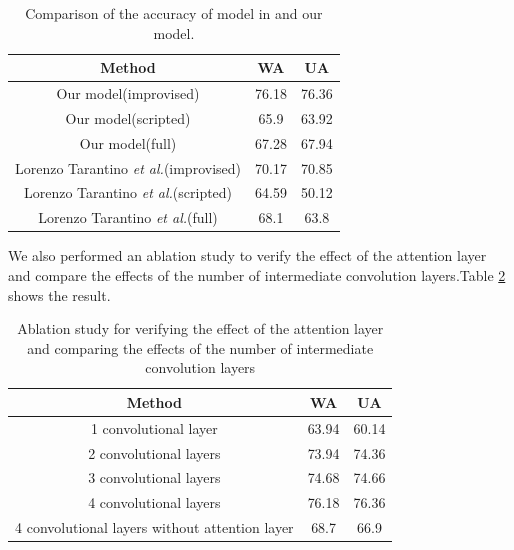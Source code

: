 \documentclass[10pt, conference, compsocconf]{IEEEtran}
\begin{document}
\begin{table}[h]
	\renewcommand\arraystretch{1.5}
	\setlength{\abovecaptionskip}{-0.2cm}
	\caption{Comparison of the accuracy of model in \cite{tarantino2019self} and our model.}
	\label{ScriptAndAll}
	\begin{center}  
		\begin{tabular}{|c|c|c|} 
			\hline  
			Method & WA & UA\\   
			\hline  
			Our model(improvised) & 76.18 & 76.36 \\   
			\hline
			Our model(scripted) & 65.9 & 63.92 \\   			
			\hline
			Our model(full) & 67.28 & 67.94 \\   
			\hline
			Lorenzo Tarantino \emph{et al.}\cite{tarantino2019self}(improvised) & 70.17 & 70.85 \\   
			\hline
			Lorenzo Tarantino \emph{et al.}\cite{tarantino2019self}(scripted) & 64.59 & 50.12 \\   
			\hline
			Lorenzo Tarantino \emph{et al.}\cite{tarantino2019self}(full) & 68.1 & 63.8 \\   
			\hline
		\end{tabular}  
	\end{center}  
\end{table}
We also performed an ablation study to verify the effect of the attention layer and compare the effects of the number of intermediate convolution layers.Table \ref{ablation}
shows the result.
\begin{table}[h] 
	\renewcommand\arraystretch{1.5}
	\setlength{\abovecaptionskip}{-0.2cm}
	\caption{Ablation study for verifying the effect of the attention layer and comparing the effects of the number of intermediate convolution layers}
	\label{ablation}
	\begin{center}  
		\begin{tabular}{|c|c|c|} 
			\hline  
			Method & WA & UA\\   
			\hline  
			1 convolutional layer & 63.94 & 60.14 \\   
			\hline
			2 convolutional layers &73.94 & 74.36 \\   			
			\hline
			3 convolutional layers & 74.68 & 74.66 \\   
			\hline
			4 convolutional layers & 76.18 & 76.36 \\   
			\hline
			4 convolutional layers
			without attention layer & 68.7 & 66.9 \\   
			\hline
		\end{tabular}  
	\end{center}  
\end{table}
\end{document}
